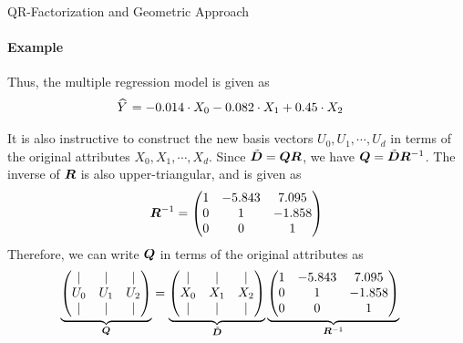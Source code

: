 \begin{frame}{QR-Factorization and Geometric Approach}
\framesubtitle{Example}
Thus, the multiple regression model is given as
\begin{align}
       \mkern 1.5mu\widehat{\mkern-1.5muY}\mkern 1.5mu & = -0.014 \cdot X_0 -0.082 \cdot X_1 + 0.45 \cdot X_2
       \label{eq:reg:linear:multiple_sol}
\end{align}

It is also instructive to construct the new basis vectors $U_0, U_1,
\cdots, U_d$ in terms of
the original attributes $X_0, X_1, \cdots, X_d$. 
Since $\tilde{{\boldsymbol D}} = {\boldsymbol Q} {\boldsymbol R}$, we have ${\boldsymbol Q} = \tilde{{\boldsymbol D}} {\boldsymbol R}^{-1}$.
The inverse of ${\boldsymbol R}$ is also upper-triangular, and is given as
\begin{align*}
    {\boldsymbol R}^{-1} = \begin{pmatrix} 
1 & -5.843 & 7.095\\
0 &   1  & -1.858\\
0 &   0  &     1
 \end{pmatrix}
\end{align*}
Therefore, we can write ${\boldsymbol Q}$ in terms of the original attributes as
\begin{align*}
    \underbrace{
    \begin{pmatrix} 
      | & |   &  | \\
      U_0 & U_1 & U_2\\
    |   & |   & | \\
     \end{pmatrix}}_{{\boldsymbol Q}} &
    = 
    \underbrace{
    \begin{pmatrix} 
      | & |   &  | \\
      X_0 & X_1 & X_2\\
    |   & |   & | \\
 \end{pmatrix}}_{\tilde{{\boldsymbol D}}} 
\underbrace{
\begin{pmatrix} 
1 & -5.843 & 7.095\\
0 &   1  & -1.858\\
0 &   0  &     1
 \end{pmatrix}}_{{\boldsymbol R}^{-1}}
\end{align*}
\end{frame}

